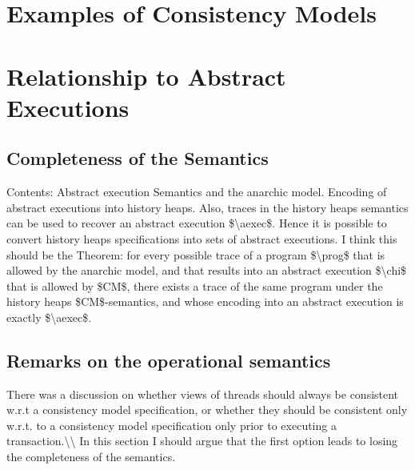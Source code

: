\documentclass[acmsmall,review,anonymous]{acmart}\settopmatter{printfolios=true,printccs=false,printacmref=false}
\begin{document}




\section{Examples of Consistency Models}

%
%

\section{Relationship to Abstract Executions}


\subsection{Completeness of the Semantics} 
\ac{Contents: Abstract execution Semantics and the anarchic model. 
Encoding of abstract executions into history heaps. Also, 
traces in the history heaps semantics can be used to recover 
an abstract execution $\aexec$. Hence it is possible to convert history heaps 
specifications into sets of abstract executions.
I think this should be the Theorem: for every possible trace of a program $\prog$ that is allowed by the anarchic 
model, and that results into an abstract execution $\chi$ that is allowed by $CM$, there 
exists a trace of the same program under the history heaps $CM$-semantics, 
and whose encoding into an abstract execution is exactly $\aexec$.}
\subsection{Remarks on the operational semantics}
\ac{There was a discussion on whether views of threads should always be consistent w.r.t a 
consistency model specification, or whether they should be consistent only w.r.t. to 
a consistency model specification only prior to executing a transaction.\\ 
In this section I should argue that the first option leads to losing the completeness of the 
semantics.}
\end{document}
